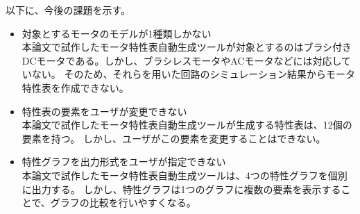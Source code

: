 以下に、今後の課題を示す。

\begin{itemize}
    \item 対象とするモータのモデルが1種類しかない\\
    本論文で試作したモータ特性表自動生成ツールが対象とするのはブラシ付きDCモータである。しかし、ブラシレスモータやACモータなどには対応していない。
    そのため、それらを用いた回路のシミュレーション結果からモータ特性表を作成できない。

\item 特性表の要素をユーザが変更できない\\
      本論文で試作したモータ特性表自動生成ツールが生成する特性表は、12個の要素を持つ。
      しかし、ユーザがこの要素を変更することはできない。

\item 特性グラフを出力形式をユーザが指定できない\\
      本論文で試作したモータ特性表自動生成ツールは、4つの特性グラフを個別に出力する。
      しかし、特性グラフは1つのグラフに複数の要素を表示することで、グラフの比較を行いやすくなる。


\end{itemize}



